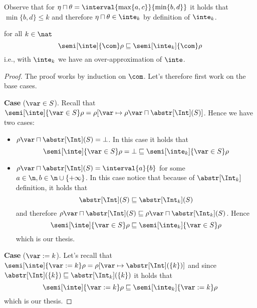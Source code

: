 Observe that for
\({\eta \sqcap \theta = \interval{\max\{a,c\}}{\min\{b,d\}}}\) it
holds that \({\min\{b,d\} \leq k}\) and therefore
\({\eta \sqcap \theta \in \inte_k}\) by definition of \(\inte_k\).
\begin{lemma}\label{le:leq}
  for all \(k\in\nat\)%
  \begin{equation*}
    \semi[\inte]{\com}\rho \sqsubseteq \semi[\inte_k]{\com}\rho
  \end{equation*}
  i.e., with \(\inte_k\) we have an over-approximation of \(\inte\).
\end{lemma}
\begin{proof}
  The proof works by induction on \(\com\). Let's therefore first work
  on the base cases.

  \medskip

  \noindent
  \textbf{Case} (\(\var \in S\)).
  Recall that
  \(\semi[\inte]{\var\in S}\rho = \rho[\var \mapsto {\rho\var \sqcap
    \abstr[\Int](S)}]\). Hence we have two cases:
  \begin{itemize}
  \item \({\rho\var \sqcap \abstr[\Int](S)} = \bot\). In this case it
    holds that
    \begin{equation*}
      \semi[\inte]{\var\in S}\rho = \bot \sqsubseteq \semi[\inte_k]{\var\in S}\rho
    \end{equation*}
    
  \item \({\rho\var \sqcap \abstr[\Int](S)} = \interval{a}{b}\) for some
    \({a \in \n}, {b \in \n\cup\{+\infty\}}\). In this case notice that
    because of \(\abstr[\Int_k]\) definition, it holds that
    \begin{equation*}
      \abstr[\Int](S) \sqsubseteq \abstr[\Int_k](S)
    \end{equation*}
    and therefore
    \({\rho\var \sqcap \abstr[\Int](S)} \sqsubseteq {\rho\var \sqcap
      \abstr[\Int_k](S)}\). Hence
    \begin{equation*}
      {\semi[\inte]{\var\in S}\rho} \sqsubseteq {\semi[\inte_k]{\var\in S}\rho}
    \end{equation*}
    which is our thesis.
  \end{itemize}

  \medskip

  \noindent
  \textbf{Case} (\(\var := k\)).
  Let's recall that
  \({\semi[\inte]{\var := k}\rho = \rho[\var \mapsto
    \abstr[\Int](\{k\})]}\) and since
  \({\abstr[\Int](\{k\})} \sqsubseteq {\abstr[\Int_k](\{k\})}\) it holds
  that
  \begin{equation*}
    \semi[\inte]{\var := k}\rho \sqsubseteq \semi[\inte_k]{\var := k}\rho
  \end{equation*}
  which is our thesis.


\end{proof}
